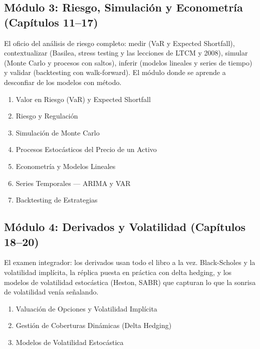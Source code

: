 \documentclass[
  spanish,
  letterpaper,
  DIV=11,
  numbers=noendperiod]{scrreprt}
\providecommand{\tightlist}{%
  \setlength{\itemsep}{0pt}\setlength{\parskip}{0pt}}
\begin{document}
\subsection*{Módulo 3: Riesgo, Simulación y Econometría (Capítulos
11--17)}\label{muxf3dulo-3-riesgo-simulaciuxf3n-y-econometruxeda-capuxedtulos-1117}

El oficio del análisis de riesgo completo: medir (VaR y Expected
Shortfall), contextualizar (Basilea, stress testing y las lecciones de
LTCM y 2008), simular (Monte Carlo y procesos con saltos), inferir
(modelos lineales y series de tiempo) y validar (backtesting con
walk-forward). El módulo donde se aprende a desconfiar de los modelos
con método.

\begin{enumerate}
\def\labelenumi{\arabic{enumi}.}
\setcounter{enumi}{10}
\tightlist
\item
  Valor en Riesgo (VaR) y Expected Shortfall
\item
  Riesgo y Regulación
\item
  Simulación de Monte Carlo
\item
  Procesos Estocásticos del Precio de un Activo
\item
  Econometría y Modelos Lineales
\item
  Series Temporales --- ARIMA y VAR
\item
  Backtesting de Estrategias
\end{enumerate}

\subsection*{Módulo 4: Derivados y Volatilidad (Capítulos
18--20)}\label{muxf3dulo-4-derivados-y-volatilidad-capuxedtulos-1820}

El examen integrador: los derivados usan todo el libro a la vez.
Black-Scholes y la volatilidad implícita, la réplica puesta en práctica
con delta hedging, y los modelos de volatilidad estocástica (Heston,
SABR) que capturan lo que la sonrisa de volatilidad venía señalando.

\begin{enumerate}
\def\labelenumi{\arabic{enumi}.}
\setcounter{enumi}{17}
\tightlist
\item
  Valuación de Opciones y Volatilidad Implícita
\item
  Gestión de Coberturas Dinámicas (Delta Hedging)
\item
  Modelos de Volatilidad Estocástica
\end{enumerate}
\end{document}
